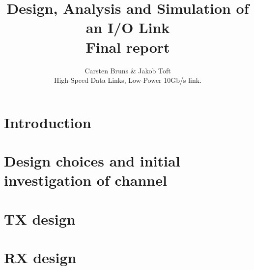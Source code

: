 \documentclass[12pt,journal,compsoc,onecolumn]{IEEEtran}
\begin{document}
%
\title{Design, Analysis and Simulation of an I/O Link\\Final report}

\author{Carsten Bruns
        \& Jakob Toft%



\begin{IEEEkeywords}
High-Speed Data Links, Low-Power 10Gb/s link.
\end{IEEEkeywords}}


\maketitle

\IEEEdisplaynotcompsoctitleabstractindextext
\IEEEpeerreviewmaketitle

\tableofcontents
\listoffigures
\listoftables

\cleardoublepage
\section{Introduction}


\cleardoublepage
\section{Design choices and initial investigation of channel}





\cleardoublepage
\section{TX design}








\cleardoublepage
\section{RX design}







\end{document}
